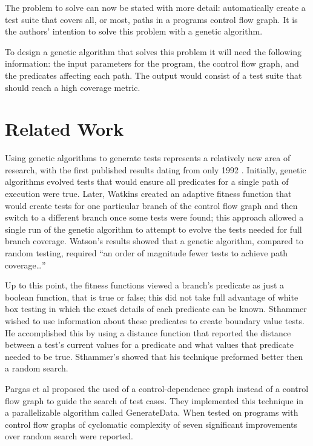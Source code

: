 \documentclass[runningheads]{llncs}
\begin{document}
The problem to solve can now be stated with more detail: automatically create a test suite that covers all, or most, paths in a programs control flow graph. It is the authors' intention to solve this problem with a genetic algorithm. 

To design a genetic algorithm that solves this problem it will need the following information: the input parameters for the program, the control flow graph, and the predicates affecting each path. The output would consist of a test suite that should reach a high coverage metric. 

\section{Related Work}
Using genetic algorithms to generate tests represents a relatively new area of research, with the first published results dating from only 1992 \cite{apps5}. Initially, genetic algorithms evolved tests that would ensure all predicates for a single path of execution were true\cite{limits6}. Later, Watkins created an adaptive fitness function that would create tests for one particular branch of the control flow graph and then switch to a different branch once some tests were found; this approach allowed a single run of the genetic algorithm to attempt to evolve the tests needed for full branch coverage\cite{limits6}. Watson's results showed that a genetic algorithm, compared to random testing, required ``an order of magnitude fewer tests to achieve path coverage…''\cite{limits6} 

Up to this point, the fitness functions viewed a branch's predicate as just a boolean function, that is true or false; this did not take full advantage of white box testing in which the exact details of each predicate can be known. Sthammer wished to use information about these predicates to create boundary value tests. He accomplished this by using a distance function that reported the distance between a test's current values for a predicate and what values that predicate needed to be true. Sthammer's showed that his technique preformed better then a random search. 

Pargas et al proposed the used of a control-dependence graph instead of a control flow graph to guide the search of test cases. They implemented this technique in a parallelizable algorithm called GenerateData\cite{pargas8}. When tested on programs with control flow graphs of cyclomatic complexity of seven significant improvements over random search were reported\cite{pargas8}.
\end{document}
